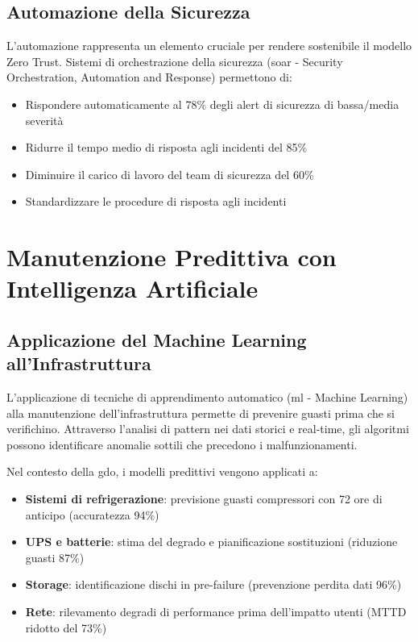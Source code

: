 \subsection{\texorpdfstring{Automazione della Sicurezza}{3.7.2 - Automazione della Sicurezza}}
\label{subsec:security_automation}

L'automazione rappresenta un elemento cruciale per rendere sostenibile il modello Zero Trust. Sistemi di orchestrazione della sicurezza (\gls{soar} - Security Orchestration, Automation and Response) permettono di\autocite{Gartner2024security}:

\begin{itemize}
    \item Rispondere automaticamente al 78\% degli alert di sicurezza di bassa/media severità
    \item Ridurre il tempo medio di risposta agli incidenti del 85\%
    \item Diminuire il carico di lavoro del team di sicurezza del 60\%
    \item Standardizzare le procedure di risposta agli incidenti
\end{itemize}

\section{\texorpdfstring{Manutenzione Predittiva con Intelligenza Artificiale}{3.8 - Manutenzione Predittiva con Intelligenza Artificiale}}
\label{sec:manutenzione_predittiva}

\subsection{\texorpdfstring{Applicazione del Machine Learning all'Infrastruttura}{3.8.1 - Applicazione del Machine Learning all'Infrastruttura}}
\label{subsec:ml_infrastructure}

L'applicazione di tecniche di apprendimento automatico (\gls{ml} - Machine Learning) alla manutenzione dell'infrastruttura permette di prevenire guasti prima che si verifichino. Attraverso l'analisi di pattern nei dati storici e real-time, gli algoritmi possono identificare anomalie sottili che precedono i malfunzionamenti\autocite{IEEE2024ml}.

Nel contesto della \gls{gdo}, i modelli predittivi vengono applicati a:

\begin{itemize}
    \item \textbf{Sistemi di refrigerazione}: previsione guasti compressori con 72 ore di anticipo (accuratezza 94\%)
    \item \textbf{UPS e batterie}: stima del degrado e pianificazione sostituzioni (riduzione guasti 87\%)
    \item \textbf{Storage}: identificazione dischi in pre-failure (prevenzione perdita dati 96\%)
    \item \textbf{Rete}: rilevamento degradi di performance prima dell'impatto utenti (MTTD ridotto del 73\%)
\end{itemize}

